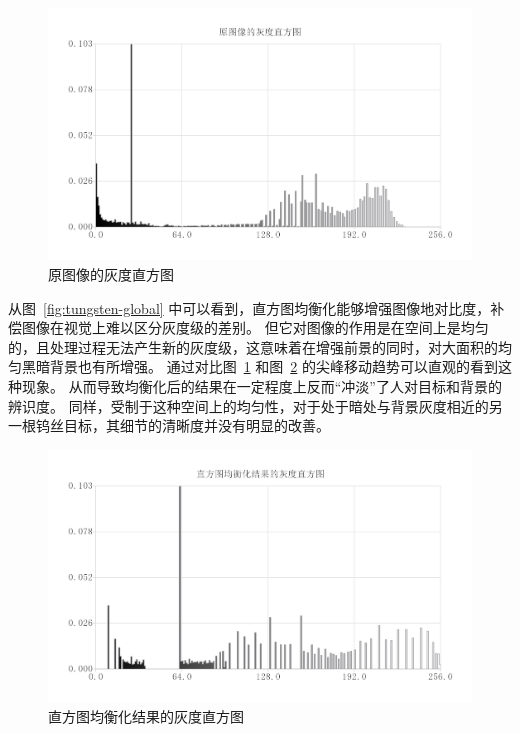 \documentclass{hitgsrep}
\begin{document}
\begin{figure}[!htb]
    \centering
    \includegraphics[width=0.9\linewidth]{tungsten-hist.png}
    \caption{原图像的灰度直方图}
    \label{fig:tungsten-origin-hist}
\end{figure}

从图~\ref{fig:tungsten-global} 中可以看到，直方图均衡化能够增强图像地对比度，补偿图像在视觉上难以区分灰度级的差别。
但它对图像的作用是在空间上是均匀的，且处理过程无法产生新的灰度级，这意味着在增强前景的同时，对大面积的均匀黑暗背景也有所增强。
通过对比图~\ref{fig:tungsten-origin-hist} 和图~\ref{fig:tungsten-global-hist} 的尖峰移动趋势可以直观的看到这种现象。
从而导致均衡化后的结果在一定程度上反而“冲淡”了人对目标和背景的辨识度。
同样，受制于这种空间上的均匀性，对于处于暗处与背景灰度相近的另一根钨丝目标，其细节的清晰度并没有明显的改善。

\begin{figure}[!htb]
    \centering
    \includegraphics[width=0.9\linewidth]{tungsten-global-hist.png}
    \caption{直方图均衡化结果的灰度直方图}
    \label{fig:tungsten-global-hist}
\end{figure}
\end{document}

